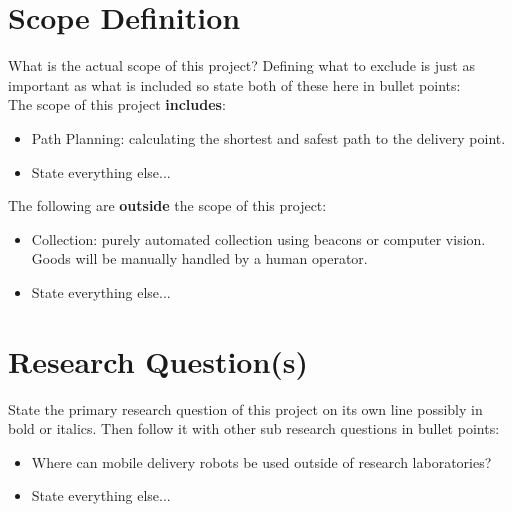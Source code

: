 
\section{Scope Definition}

\noindent
What is the actual scope of this project? Defining what to exclude is just as important as what is included so state both of these here in bullet points:\\

\noindent
The scope of this project \textbf{includes}:
\begin{itemize}
\item Path Planning: calculating the shortest and safest path to the delivery point.

\item State everything else...
\end{itemize}

\noindent
The following are \textbf{outside} the scope of this project:
\begin{itemize}
\item Collection: purely automated collection using beacons or computer vision. Goods will be manually handled by a human operator.

\item State everything else...
\end{itemize}


\section{Research Question(s)}

\noindent
State the primary research question of this project on its own line possibly in bold or italics. Then follow it with other sub research questions in bullet points:

\begin{itemize}
\item Where can mobile delivery robots be used outside of research laboratories?

\item State everything else...
\end{itemize}


